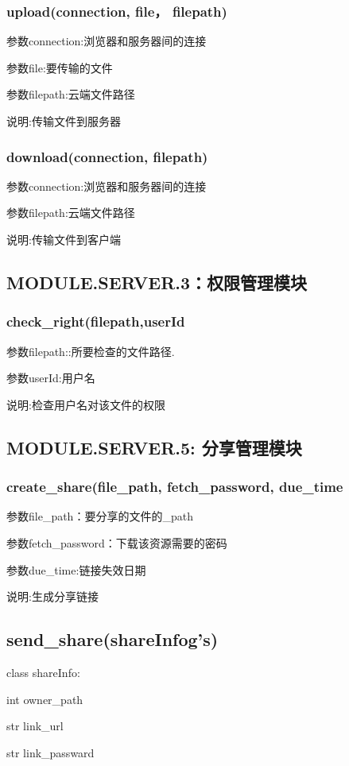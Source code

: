 \subsubsection{upload(connection, file， filepath)}
参数connection:浏览器和服务器间的连接

参数file:要传输的文件

参数filepath:云端文件路径

说明:传输文件到服务器
\subsubsection{download(connection, filepath)}

参数connection:浏览器和服务器间的连接

参数filepath:云端文件路径

说明:传输文件到客户端
\subsection{MODULE.SERVER.3：权限管理模块}
\subsubsection{check\_right(filepath,userId}
参数filepath::所要检查的文件路径.

参数userId:用户名

说明:检查用户名对该文件的权限

\subsection{MODULE.SERVER.5: 分享管理模块}
\subsubsection{create\_share(file\_path, fetch\_password, due\_time}
参数file\_path：要分享的文件的\_path

参数fetch\_password：下载该资源需要的密码

参数due\_time:链接失效日期

说明:生成分享链接

\subsection{send\_share(shareInfog's)}
class shareInfo:

    int owner\_path

    str link\_url

    str link\_passward

